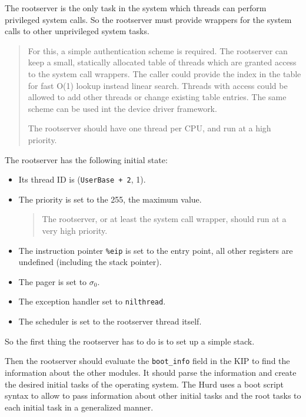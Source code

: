 \documentclass[9pt,a4paper]{extarticle}
\newenvironment{comment}{\footnotesize \begin{quote}}{\end{quote}}
\begin{document}
The rootserver is the only task in the system which threads can
perform privileged system calls.  So the rootserver must provide
wrappers for the system calls to other unprivileged system tasks.

\begin{comment}
  For this, a simple authentication scheme is required.  The
  rootserver can keep a small, statically allocated table of threads
  which are granted access to the system call wrappers.  The caller
  could provide the index in the table for fast O(1) lookup instead
  linear search.  Threads with access could be allowed to add other
  threads or change existing table entries.  The same scheme can be
  used int the device driver framework.
  
  The rootserver should have one thread per CPU, and run at a high
  priority.
\end{comment}

The rootserver has the following initial state:

\begin{itemize}
\item Its thread ID is (\verb/UserBase + 2/, 1).

\item The priority is set to the 255, the maximum value.

  \begin{comment}
    The rootserver, or at least the system call wrapper, should run at
    a very high priority.
  \end{comment}

\item The instruction pointer \verb/%eip/ is set to the entry point,
all other registers are undefined (including the stack pointer).

\item The pager is set to $\sigma_0$.
  
\item The exception handler set to \verb/nilthread/.
  
\item The scheduler is set to the rootserver thread itself.
\end{itemize}

So the first thing the rootserver has to do is to set up a simple
stack.

Then the rootserver should evaluate the \verb/boot_info/ field in the
KIP to find the information about the other modules.  It should parse
the information and create the desired initial tasks of the operating
system.  The Hurd uses a boot script syntax to allow to pass
information about other initial tasks and the root tasks to each
initial task in a generalized manner.
\end{document}
